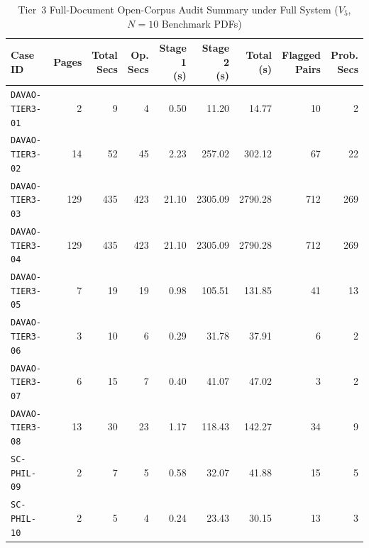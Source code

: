 \begin{table}[htbp]
    \centering
    \scriptsize
    \setlength{\tabcolsep}{3.0pt}
    \renewcommand{\arraystretch}{0.88}
    \caption[Tier 3 Open-Corpus Audit Metrics across Benchmark Cases]{Tier~3 Full-Document Open-Corpus Audit Summary under Full System ($V_5$, $N = 10$ Benchmark PDFs)}
    \label{tab:app_tier3_summary}
    \begin{tabular*}{\linewidth}{@{}l@{\extracolsep{\fill}}rrrrrrrr@{}}
        \toprule
        \textbf{Case ID} & \textbf{Pages} & \shortstack[r]{\textbf{Total}\\\textbf{Secs}} & \shortstack[r]{\textbf{Op.}\\\textbf{Secs}} & \shortstack[r]{\textbf{Stage 1}\\\textbf{(s)}} & \shortstack[r]{\textbf{Stage 2}\\\textbf{(s)}} & \shortstack[r]{\textbf{Total}\\\textbf{(s)}} & \shortstack[r]{\textbf{Flagged}\\\textbf{Pairs}} & \shortstack[r]{\textbf{Prob.}\\\textbf{Secs}} \\
        \midrule
        \texttt{DAVAO-TIER3-01} & 2 & 9 & 4 & 0.50 & 11.20 & 14.77 & 10 & 2 \\
        \texttt{DAVAO-TIER3-02} & 14 & 52 & 45 & 2.23 & 257.02 & 302.12 & 67 & 22 \\
        \texttt{DAVAO-TIER3-03} & 129 & 435 & 423 & 21.10 & 2305.09 & 2790.28 & 712 & 269 \\
        \texttt{DAVAO-TIER3-04} & 129 & 435 & 423 & 21.10 & 2305.09 & 2790.28 & 712 & 269 \\
        \texttt{DAVAO-TIER3-05} & 7 & 19 & 19 & 0.98 & 105.51 & 131.85 & 41 & 13 \\
        \texttt{DAVAO-TIER3-06} & 3 & 10 & 6 & 0.29 & 31.78 & 37.91 & 6 & 2 \\
        \texttt{DAVAO-TIER3-07} & 6 & 15 & 7 & 0.40 & 41.07 & 47.02 & 3 & 2 \\
        \texttt{DAVAO-TIER3-08} & 13 & 30 & 23 & 1.17 & 118.43 & 142.27 & 34 & 9 \\
        \texttt{SC-PHIL-09} & 2 & 7 & 5 & 0.58 & 32.07 & 41.88 & 15 & 5 \\
        \texttt{SC-PHIL-10} & 2 & 5 & 4 & 0.24 & 23.43 & 30.15 & 13 & 3 \\
        \bottomrule
    \end{tabular*}
\end{table}

